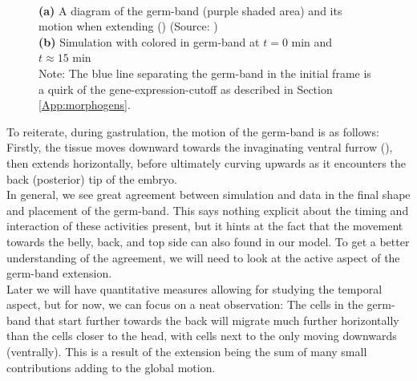 \begin{figure}[H]
\begin{subfigure}[b]{0.61\textwidth}
    \caption{}
    \end{subfigure}
    \caption{\\
    \textbf{(a)} A diagram of the germ-band (purple shaded area) and its motion when extending () (Source: )\\
    \textbf{(b)} Simulation with colored in germ-band at $t = 0 \text{ min}$ and $t \approx 15 \text{ min}$\\Note: The blue line separating the germ-band in the initial frame is a quirk of the gene-expression-cutoff as described in Section \ref{App:morphogens}.}
    \label{fig:germbandCompare}
\end{figure}



To reiterate, during gastrulation, the motion of the germ-band is as follows:\\Firstly, the tissue moves downward towards the invaginating ventral furrow (), then extends horizontally, before ultimately curving upwards as it encounters the back (posterior) tip of the embryo.\\

In general, we see great agreement between simulation and data in the final shape and placement of the germ-band. This says nothing explicit about the timing and interaction of these activities present, but it hints at the fact that the movement towards the belly, back, and top side can also found in our model. To get a better understanding of the agreement, we will need to look at the active aspect of the germ-band extension.\\

Later we will have quantitative measures allowing for studying the temporal aspect, but for now, we can focus on a neat observation: The cells in the germ-band that start further towards the back will migrate much further horizontally than the cells closer to the head, with cells next to the  only moving downwards (ventrally). This is a result of the extension being the sum of many small contributions adding to the global motion. 

